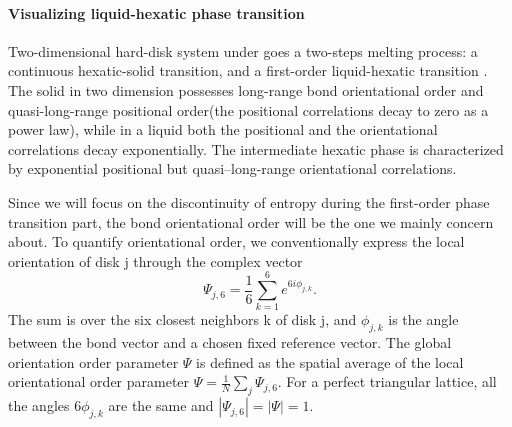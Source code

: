 \documentclass[a4paper]{article}
\begin{document}
\paragraph{Visualizing liquid-hexatic phase transition}

Two-dimensional hard-disk system under goes a two-steps melting process: a continuous hexatic-solid transition, and a first-order liquid-hexatic transition \cite{PhysRevLett.107.155704}. The solid in two dimension possesses long-range bond orientational order and quasi-long-range positional order(the positional correlations decay to zero as a power law), while in a liquid both the positional and the orientational correlations decay exponentially. The intermediate hexatic phase is characterized by exponential positional but quasi–long-range orientational correlations. 

Since we will focus on the discontinuity of entropy during the first-order phase transition part, the bond orientational order will be the one we mainly concern about. To quantify orientational order, we conventionally express the local orientation of disk j through the complex vector \cite{PhysRevE.87.042134}
\begin{equation}
\Psi_{j,6}=\frac16 \sum_{k=1}^{6} e^{6 i \phi_{j,k}}.
\end{equation}
The sum is over the six closest neighbors k of disk j, and $\phi_{j,k}$ is the angle between the bond vector and a chosen fixed reference vector. The global orientation order parameter $\Psi$ is defined as the spatial average of the local orientational order parameter $\Psi = \frac1N \sum_{j} \Psi_{j,6}$. For a perfect triangular lattice, all the
angles $6\phi_{j,k}$ are the same and $|\Psi_{j,6}|=|\Psi|=1$.
\end{document}
